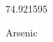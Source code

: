 \documentclass[12pt]{article}
\begin{document}
\hfill{}
\vfill
\begin{center}
  {\fontsize{50}{60}
  }

  \vspace{1em}

  74.921595

Arsenic
\end{center}
\vfill
\end{document}
